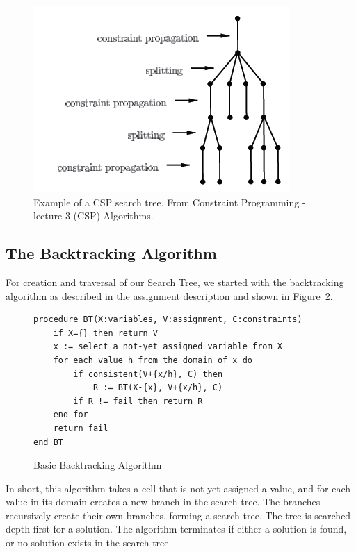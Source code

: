 \documentclass[11pt]{article} %
\begin{document}
\begin{figure}[htbp]
\begin{center}
\includegraphics{tree.png}
\caption{Example of a CSP search tree. From Constraint Programming - lecture 3 (CSP) Algorithms. }
\label{fig:basic_tree}
\end{center}
\end{figure}

\subsection{The Backtracking Algorithm}
\label{sec:bt}

For creation and traversal of our Search Tree, we started with the backtracking algorithm as described in the assignment description and shown in Figure~\ref{code:BT}.

\begin{figure}
\begin{verbatim}
procedure BT(X:variables, V:assignment, C:constraints)
    if X={} then return V
    x := select a not-yet assigned variable from X
    for each value h from the domain of x do
        if consistent(V+{x/h}, C) then
            R := BT(X-{x}, V+{x/h}, C)
        if R != fail then return R
    end for
    return fail
end BT
\end{verbatim}
\caption{Basic Backtracking Algorithm}
\label{code:BT}
\end{figure}

In short, this algorithm takes a cell that is not yet assigned a value, and for each value in its domain creates a new branch in the search tree. The branches recursively create their own branches, forming a search tree. The tree is searched depth-first for a solution. The algorithm terminates if either a solution is found, or no solution exists in the search tree.
\end{document}
